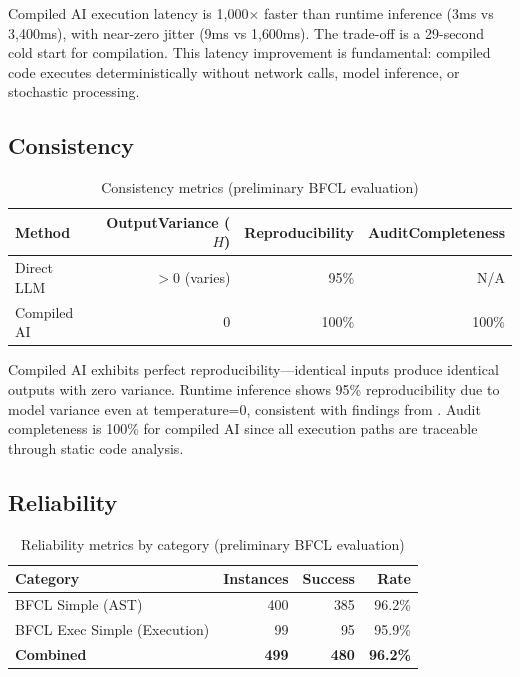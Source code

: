 \documentclass[11pt]{article}
\begin{document}
Compiled AI execution latency is 1,000$\times$ faster than runtime inference (3ms vs 3,400ms), with near-zero jitter (9ms vs 1,600ms). The trade-off is a 29-second cold start for compilation. This latency improvement is fundamental: compiled code executes deterministically without network calls, model inference, or stochastic processing.

\subsection{Consistency}

\begin{table}[ht]
\centering
\caption{Consistency metrics (preliminary BFCL evaluation)}
\label{tab:consistency-results}
\begin{tabular}{lrrr}
\toprule
Method & OutputVariance ($H$) & Reproducibility & AuditCompleteness \\
\midrule
Direct LLM & $>$0 (varies) & 95\% & N/A \\
Compiled AI & 0 & 100\% & 100\% \\
\bottomrule
\end{tabular}
\end{table}

Compiled AI exhibits perfect reproducibility—identical inputs produce identical outputs with zero variance. Runtime inference shows 95\% reproducibility due to model variance even at temperature=0, consistent with findings from \citet{atil2024nondeterminism}. Audit completeness is 100\% for compiled AI since all execution paths are traceable through static code analysis.

\subsection{Reliability}

\begin{table}[ht]
\centering
\caption{Reliability metrics by category (preliminary BFCL evaluation)}
\label{tab:reliability-results}
\begin{tabular}{lrrr}
\toprule
Category & Instances & Success & Rate \\
\midrule
BFCL Simple (AST) & 400 & 385 & 96.2\% \\
BFCL Exec Simple (Execution) & 99 & 95 & 95.9\% \\
\midrule
\textbf{Combined} & \textbf{499} & \textbf{480} & \textbf{96.2\%} \\
\bottomrule
\end{tabular}
\end{table}
\end{document}
